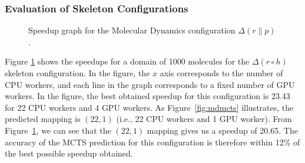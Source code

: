 \documentclass[smallextended]{svjour3}
\begin{document}
\subsubsection{Evaluation of Skeleton Configurations}
\begin{figure}[t!]
\begin{center}
\caption{Speedup graph for the Molecular Dynamics configuration
  $\Delta(r \parallel p)$.}
\label{MD1}
\end{center}
\end{figure}

Figure \ref{MD1} shows the speedups for a domain of 1000 molecules for the $\Delta(r \circ h)$ skeleton configuration.
In the figure, the $x$ axis corresponds to the number of CPU workers, and each
line in the graph corresponds to a fixed number of GPU workers.
In the figure, the best obtained speedup for this configuration is 23.43 for 22 CPU workers and 4 GPU workers.
As Figure~\ref{fig:mdmcts} illustrates, the predicted mapping is $(22,1)$ (i.e., 22 CPU workers and 1 GPU worker).
From Figure~\ref{MD1}, we can see that the $(22,1)$ mapping gives us a speedup of 20.65. The accuracy of the MCTS prediction for this
configuration is therefore within 12\% of the best possible speedup obtained.
\end{document}
